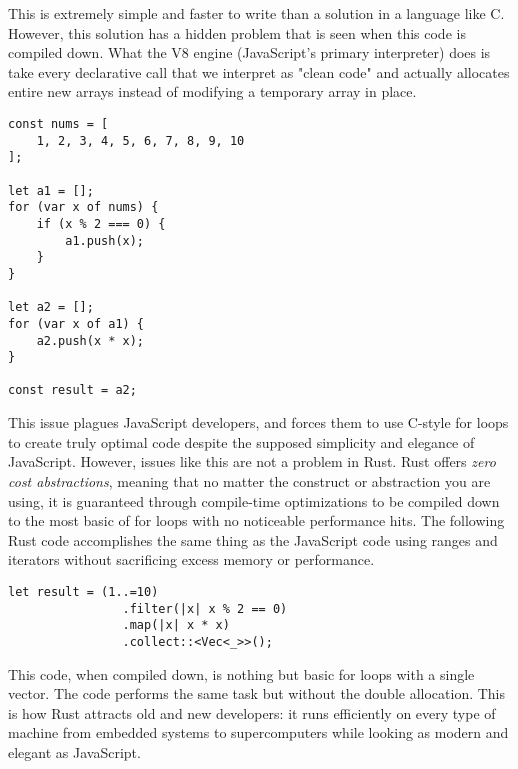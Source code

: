 \begin{multicols}{2}
This is extremely simple and faster to write than a solution in a language like C. However, this solution has a hidden
problem that is seen when this code is compiled down. What the V8 engine (JavaScript's primary interpreter) does is take
every declarative call that we interpret as "clean code" and actually allocates entire new arrays instead of modifying
a temporary array in place.

\vspace{\baselineskip}
\noindent
\begin{minipage}[]{\linewidth}
\begin{verbatim}
const nums = [
    1, 2, 3, 4, 5, 6, 7, 8, 9, 10
];

let a1 = [];
for (var x of nums) {
    if (x % 2 === 0) {
        a1.push(x);
    }
}

let a2 = [];
for (var x of a1) {
    a2.push(x * x);
}

const result = a2;
\end{verbatim}
\end{minipage}
\vspace{\baselineskip}

This issue plagues JavaScript developers, and forces them to use C-style for loops to create truly optimal code despite
the supposed simplicity and elegance of JavaScript. However, issues like this are not a problem in Rust. Rust offers
\textit{zero cost abstractions}, meaning that no matter the construct or abstraction you are using, it is guaranteed
through compile-time optimizations to be compiled down to the most basic of for loops with no noticeable performance
hits. The following Rust code accomplishes the same thing as the JavaScript code using ranges and iterators without
sacrificing excess memory or performance.

\vspace{\baselineskip}
\noindent
\begin{minipage}[]{\linewidth}
\begin{verbatim}
let result = (1..=10)
                .filter(|x| x % 2 == 0)
                .map(|x| x * x)
                .collect::<Vec<_>>();
\end{verbatim}
\end{minipage}
\vspace{\baselineskip}

This code, when compiled down, is nothing but basic for loops with a single vector. The code performs the same task
but without the double allocation. This is how Rust attracts old and new developers: it runs efficiently on every
type of machine from embedded systems to supercomputers while looking as modern and elegant as JavaScript.


\end{multicols}
